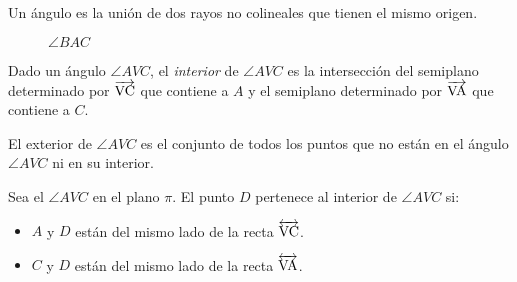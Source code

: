 \begin{definition}
Un ángulo es la unión de dos rayos no colineales que tienen el mismo origen.

\begin{figure}[!h]
    \centering
    
    \label{fig:angle}
    \caption{$\angle{BAC}$}
\end{figure}

\end{definition}

\begin{definition}
Dado un ángulo $\angle{AVC}$, el \textit{interior} de $\angle{AVC}$ es la intersección del semiplano determinado por $\overrightarrow{\rm VC}$ que contiene a $A$ y el semiplano determinado por $\overrightarrow{\rm VA}$ que contiene a $C$.

\end{definition}

\begin{definition}
El exterior de $\angle{AVC}$ es el conjunto de todos los puntos que no están en el ángulo $\angle{AVC}$ ni en su interior.
\end{definition}
    
\begin{definition}
Sea el $\angle{AVC}$ en el plano $\pi$. El punto $D$ pertenece al interior de $\angle{AVC}$ si:

\begin{itemize}
    \item $A$ y $D$ están del mismo lado de la recta $\overleftrightarrow{\rm VC}$.
    \item $C$ y $D$ están del mismo lado de la recta $\overleftrightarrow{\rm VA}$.
\end{itemize}

\begin{figure}[h!]

    \centering

    \begin{subfigure}[b]{.5\textwidth}
        \centering
        
        \label{fig:angle-interior}
    \end{subfigure}%
    \begin{subfigure}[b]{.5\textwidth}
        \centering
        
        \label{fig:angle-exterior}
    \end{subfigure}

    \centering
    \label{fig:angle-int-ext}
    
\end{figure}    


\end{definition}

